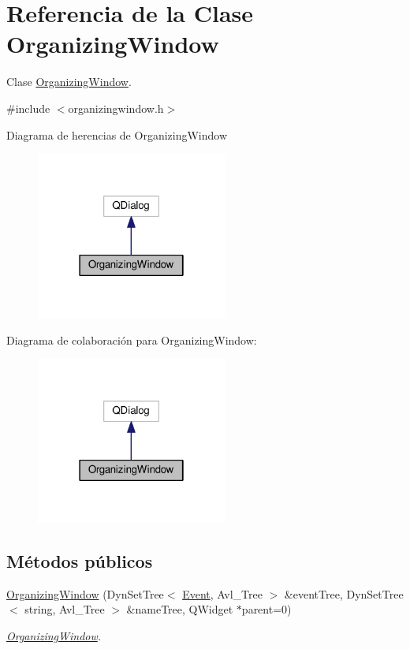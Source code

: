 \hypertarget{class_organizing_window}{}\section{Referencia de la Clase Organizing\+Window}
\label{class_organizing_window}


Clase \hyperlink{class_organizing_window}{Organizing\+Window}.  




{\ttfamily \#include $<$organizingwindow.\+h$>$}



Diagrama de herencias de Organizing\+Window\nopagebreak
\begin{figure}[H]
\begin{center}
\leavevmode
\includegraphics[width=178pt]{class_organizing_window__inherit__graph}
\end{center}
\end{figure}


Diagrama de colaboración para Organizing\+Window\+:\nopagebreak
\begin{figure}[H]
\begin{center}
\leavevmode
\includegraphics[width=178pt]{class_organizing_window__coll__graph}
\end{center}
\end{figure}
\subsection*{Métodos públicos}
\begin{DoxyCompactItemize}
\item 
\hyperlink{class_organizing_window_abc14b61dd4615d4200ffd1b4c036e529}{Organizing\+Window} (Dyn\+Set\+Tree$<$ \hyperlink{class_event}{Event}, Avl\+\_\+\+Tree $>$ \&event\+Tree, Dyn\+Set\+Tree$<$ string, Avl\+\_\+\+Tree $>$ \&name\+Tree, Q\+Widget $\ast$parent=0)
\begin{DoxyCompactList}\small\item\em \hyperlink{class_organizing_window}{Organizing\+Window}. \end{DoxyCompactList}\end{DoxyCompactItemize}
